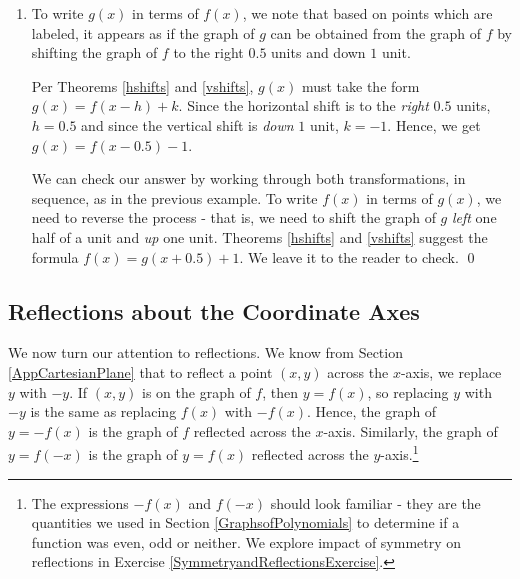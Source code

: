 \documentclass{ximera}
\begin{document}
\begin{example}
\begin{enumerate}
\begin{enumerate}
To check, we start with the point $(-3, -2)$.  We find when we substitute $x=-3$ into the equation $y=f(x+1)-2$ we get $y = f(-3+1)-2 = f(-2)-2$.  Since $(-2,0)$ is on the graph of $f$, we know $f(-2) =0$, so  $y = f(-3+1)-2 = f(-2)-2 = 0 - 2 = -2$.  This proves $(-3,-2)$ is on the graph of $y=f(x+1)-2$.  We leave the checks of the remaining points to the reader.

\end{enumerate}

\item  To write $g(x)$ in terms of $f(x)$, we note that based on points which are labeled, it appears as if the graph of $g$ can be obtained from the graph of $f$ by shifting the graph of $f$ to the right $0.5$ units and down $1$ unit.  

\smallskip

Per Theorems \ref{hshifts} and \ref{vshifts}, $g(x)$ must take the form $g(x) = f(x-h)+k$.  Since the horizontal shift is to the \textit{right} $0.5$ units, $h = 0.5$ and since the vertical shift is \textit{down} $1$ unit, $k = -1$.   Hence, we get $g(x) = f(x-0.5)-1$.  

\smallskip

We can check our answer by working through both transformations, in sequence, as in the previous example.   To write $f(x)$ in terms of $g(x)$, we need to reverse the process - that is, we need to shift the graph of $g$ \textit{left} one half of a unit and \textit{up} one unit.   Theorems \ref{hshifts} and \ref{vshifts} suggest the formula $f(x) = g(x+0.5)+1$.  We leave it to the reader to check. \qed
  
 \end{enumerate}
 
 \end{example}
 
\subsection{Reflections about the Coordinate Axes}

We now turn our attention to reflections. We know from Section \ref{AppCartesianPlane} that to reflect a point $(x,y)$ across the $x$-axis, we replace $y$ with $-y$.  If $(x,y)$ is on the graph of $f$, then $y=f(x)$, so replacing $y$ with $-y$ is the same as replacing $f(x)$ with $-f(x)$.  Hence, the graph of $y=-f(x)$ is the graph of $f$ reflected across the $x$-axis.  Similarly, the graph of $y=f(-x)$ is the graph of $y = f(x)$ reflected across the $y$-axis.\footnote{The expressions $-f(x)$ and $f(-x)$ should look familiar - they are the quantities we used in Section \ref{GraphsofPolynomials} to determine if a function was even, odd or neither.  We explore impact of symmetry on reflections in Exercise \ref{SymmetryandReflectionsExercise}.}   
\end{document}
